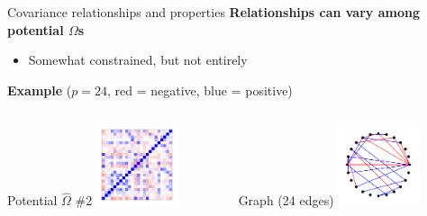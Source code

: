 \documentclass[professionalfonts]{beamer}
\begin{document}
\begin{frame}{Covariance relationships and properties}
\textbf{Relationships can vary among potential $\Omega$s}
\begin{itemize}
\item Somewhat constrained, but not entirely
\end{itemize}
\textbf{Example} ($p = 24$, {\color{red} red} = negative, {\color{blue} blue} = positive)
\begin{columns}
\begin{column}{0.45\textwidth}
\begin{center}
Potential $\widehat{\Omega}$ \#2
\includegraphics[width=90px]{figs/example-alt2-cor.pdf}
\end{center}
\end{column}
\begin{column}{0.45\textwidth}
\begin{center}
Graph (24 edges)
\includegraphics[width=90px]{figs/example-alt2-graph.pdf}
\end{center}
\end{column}
\end{columns}
\end{frame}
\end{document}
